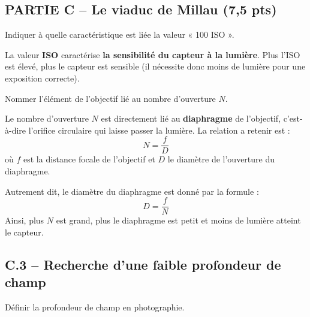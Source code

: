 \documentclass[answers]{exam}
\begin{document}
\begin{figure}[H]
  \centering
\end{figure}



\subsection*{PARTIE C – Le viaduc de Millau (7,5 pts)}

\begin{questions}

\question[C.1] Indiquer à quelle caractéristique est liée la valeur « 100 ISO ».

  \begin{solution}
  La valeur \textbf{ISO} caractérise \textbf{la sensibilité du capteur à la lumière}.  
  Plus l’ISO est élevé, plus le capteur est sensible (il nécessite donc moins de lumière pour une exposition correcte).  
  \end{solution}


\question[C.2] Nommer l’élément de l’objectif lié au nombre d’ouverture $N$.

  \begin{solution}
  Le nombre d’ouverture $N$ est directement lié au \textbf{diaphragme} de l’objectif, c’est-à-dire l’orifice circulaire qui laisse passer la lumière. La relation a retenir est : 
\[
  N = \frac{f}{D}
\]
  où $f$ est la distance focale de l’objectif et $D$ le diamètre de l’ouverture du diaphragme.

  Autrement dit, le diamètre du diaphragme est donné par la formule :
\[
  D = \frac{f}{N}
\]
  Ainsi, plus $N$ est grand, plus le diaphragme est petit et moins de lumière atteint le capteur.

  \end{solution}


\subsection*{C.3 – Recherche d’une faible profondeur de champ}

\begin{questions}

\question[C.3.1] Définir la profondeur de champ en photographie.


\end{questions}
\end{questions}
\end{document}

